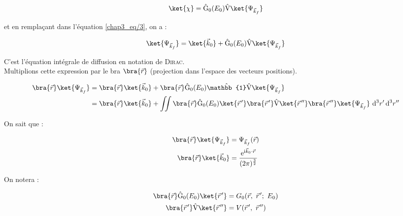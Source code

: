 \documentclass[12pt,a4paper,oneside,french]{book}
\renewcommand{\i}{\mathrm{i}}
\newcommand{\e}{\mathrm{e}}
\newcommand{\opr}[1]{\mathrm{\hat{#1}}}
\newcommand{\diff}{\mathrm{d}}
\newcommand{\identity}{\mathbb{1}}
\newcommand{\pvec}[1]{\vec{#1} \mkern2mu \vphantom{#1}}
\theoremstyle{definition}
\theoremstyle{definition}
\theoremstyle{definition}
\theoremstyle{remark}
\theoremstyle{definition}
\begin{document}
    \begin{equation*}
        \ket{\chi \vphantom{{\Psi}_{{\vec{k}}_{f}}}} = \opr{G}_{0}({E}_{0}) \opr{V} \ket{{\Psi}_{{\vec{k}}_{f}}}
    \end{equation*}
    
    et en remplaçant dans l'équation \eqref{chap3_eq/3}, on a :
    
    \begin{equation*}
        \ket{{\Psi}_{{\vec{k}}_{f}}} = \ket{{\vec{k}}_{0} \vphantom{{\Psi}_{{\vec{k}}_{f}}}} + \opr{G}_{0}({E}_{0}) \opr{V} \ket{{\Psi}_{{\vec{k}}_{f}}}
    \end{equation*}
    
    C'est l'équation intégrale de diffusion en notation de \textsc{Dirac}. \\
    
    Multiplions cette expression par le bra $\bra{\vec{r}}$ (projection dans l'espace des vecteurs positions).
    
    \begin{equation*}
    \begin{split}
        \bra{\vec{r}} \ket{{\Psi}_{{\vec{k}}_{f}}} 
            &= \bra{\vec{r}} \ket{{\vec{k}}_{0}} + \bra{\vec{r} \vphantom{{\Psi}_{{\vec{k}}_{f}}}} \opr{G}_{0}({E}_{0}) \opr{\identity} \opr{V} \ket{{\Psi}_{{\vec{k}}_{f}}} \\
            &= \bra{\vec{r}} \ket{{\vec{k}}_{0}} + \iint \bra{\vec{r} \vphantom{\pvec{r}'}} \opr{G}_{0}({E}_{0}) \ket{\pvec{r}'} \bra{\pvec{r}'} \opr{V} \ket{\pvec{r}''} \bra{\pvec{r}''} \ket{{\Psi}_{{\vec{k}}_{f}}} \ {\diff}^{3} r' \, {\diff}^{3} r''
    \end{split}
    \end{equation*}
    
    On sait que :
    
    \begin{align*}
    \begin{split}
        \bra{\vec{r}} \ket{{\Psi}_{{\vec{k}}_{f}}} &= {\Psi}_{{\vec{k}}_{f}}(\vec{r}) \\
        \bra{\vec{r}} \ket{{\vec{k}}_{0}} &= \frac{{\e}^{\i {\vec{k}}_{0} \cdot \vec{r}}}{(2\pi)^{\frac{3}{2}}}
    \end{split}
    \end{align*}
    
    On notera :
    
    \begin{align*}
    \begin{split}
        \bra{\vec{r} \vphantom{\pvec{r}'}} \opr{G}_{0}({E}_{0}) \ket{\pvec{r}'} &= {G}_{0}(\vec{r}, \ \pvec{r}'; \ {E}_{0}) \\
        \bra{\pvec{r}'} \opr{V} \ket{\pvec{r}''} &= V(\pvec{r}', \ \pvec{r}'')
    \end{split}
    \end{align*}
    
\end{document}
